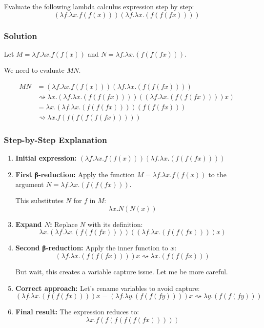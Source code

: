 \documentclass{article}
\theoremstyle{plain}
\theoremstyle{definition}
\theoremstyle{remark}
\begin{document}
Evaluate the following lambda calculus expression step by step:
$$(\lambda f.\lambda x.f(f(x))) (\lambda f.\lambda x.(f(f(f x))))$$

\subsubsection{Solution}

Let $M = \lambda f.\lambda x.f(f(x))$ and $N = \lambda f.\lambda x.(f(f(f x)))$.

We need to evaluate $M N$.

\begin{align}
M N &= (\lambda f.\lambda x.f(f(x))) (\lambda f.\lambda x.(f(f(f x)))) \\
&\rightsquigarrow \lambda x. (\lambda f.\lambda x.(f(f(f x)))) ((\lambda f.\lambda x.(f(f(f x)))) x) \\
&= \lambda x. (\lambda f.\lambda x.(f(f(f x)))) (f(f(f x))) \\
&\rightsquigarrow \lambda x. f(f(f(f(f(f x)))))
\end{align}

\subsubsection{Step-by-Step Explanation}

\begin{enumerate}
    \item \textbf{Initial expression:} $(\lambda f.\lambda x.f(f(x))) (\lambda f.\lambda x.(f(f(f x))))$
    
    \item \textbf{First β-reduction:} Apply the function $M = \lambda f.\lambda x.f(f(x))$ to the argument $N = \lambda f.\lambda x.(f(f(f x)))$.
    
    This substitutes $N$ for $f$ in $M$:
    $$\lambda x. N(N(x))$$
    
    \item \textbf{Expand $N$:} Replace $N$ with its definition:
    $$\lambda x. (\lambda f.\lambda x.(f(f(f x)))) ((\lambda f.\lambda x.(f(f(f x)))) x)$$
    
    \item \textbf{Second β-reduction:} Apply the inner function to $x$:
    $$(\lambda f.\lambda x.(f(f(f x)))) x \rightsquigarrow \lambda x.(f(f(f x)))$$
    
    But wait, this creates a variable capture issue. Let me be more careful.
    
    \item \textbf{Correct approach:} Let's rename variables to avoid capture:
    $$(\lambda f.\lambda x.(f(f(f x)))) x = (\lambda f.\lambda y.(f(f(f y)))) x \rightsquigarrow \lambda y.(f(f(f y)))$$
    
    \item \textbf{Final result:} The expression reduces to:
    $$\lambda x. f(f(f(f(f(f x)))))$$
\end{enumerate}
\end{document}
